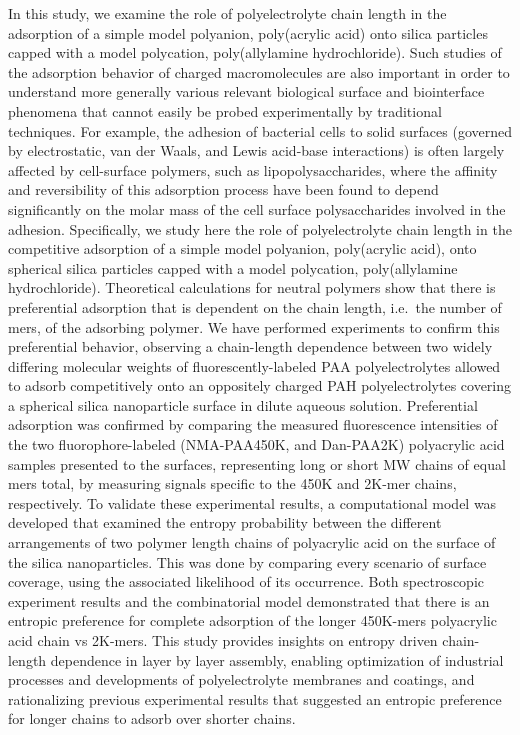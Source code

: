 \documentclass[journal=mamobx,manuscript=article]{achemso}
\begin{document}
In this study, we examine the role of polyelectrolyte chain length in the adsorption of a simple model polyanion, poly(acrylic acid) onto silica particles capped with a model polycation, poly(allylamine hydrochloride).  Such studies of the adsorption behavior of charged macromolecules are also important in order to understand more generally various relevant biological surface and biointerface phenomena that cannot easily be probed experimentally by traditional techniques.  For example, the adhesion of bacterial cells to solid surfaces (governed by electrostatic, van der Waals, and Lewis acid-base interactions) is often largely affected by cell-surface polymers, such as lipopolysaccharides,\cite{Jucker1997} where   the affinity and reversibility of this adsorption process have been found to depend significantly on the molar mass of the cell surface polysaccharides involved in the adhesion.\cite{Jucker1997}  Specifically, we study here the role of polyelectrolyte chain length in the competitive adsorption of a simple model polyanion, poly(acrylic acid), onto spherical silica particles capped with a model polycation, poly(allylamine hydrochloride). Theoretical calculations for neutral polymers show that there is preferential adsorption that is dependent on the chain length, i.e.\ the number of mers, of the adsorbing polymer. We have performed experiments to confirm this preferential behavior, observing a chain-length dependence between two widely differing molecular weights of fluorescently-labeled PAA polyelectrolytes allowed to adsorb competitively onto an oppositely charged PAH polyelectrolytes covering a spherical silica nanoparticle surface in dilute aqueous solution. Preferential adsorption was confirmed by comparing the measured fluorescence intensities of the two fluorophore-labeled (NMA-PAA450K, and Dan-PAA2K) polyacrylic acid samples presented to the surfaces, representing long or short MW chains of equal mers total, by measuring signals specific to the 450K and 2K-mer chains, respectively. To validate these experimental results, a computational model was developed that examined the entropy probability between the different arrangements of two polymer length chains of polyacrylic acid on the surface of the silica nanoparticles. This was done by comparing every scenario of surface coverage, using the associated likelihood of its occurrence. Both spectroscopic experiment results and the combinatorial model demonstrated that there is an entropic preference for complete adsorption of the longer 450K-mers polyacrylic acid chain vs 2K-mers. This study provides insights on entropy driven chain-length dependence in layer by layer assembly, enabling optimization of industrial processes and developments of polyelectrolyte membranes and coatings, and rationalizing previous experimental results that suggested an entropic preference for longer chains to adsorb over shorter chains.
\end{document}
